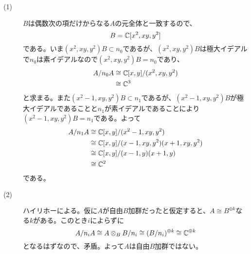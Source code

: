 \subsubsection{}%
\begin{sol} ${}$
\begin{description}
  \item[(1)] $B$は偶数次の項だけからなる$A$の元全体と一致するので、
  \[
B = {\mathbb C}[x^2, xy, y^2]
  \]
  である。いま$(x^2,xy,y^2)B \subset n_0$であるが、$(x^2,xy,y^2)B$は極大イデアルで$n_0$は素イデアルなので$(x^2,xy,y^2)B = n_0$であり、
\begin{align*}
  A/ n_0 A &\cong {\mathbb C}[x,y]/(x^2,xy,y^2) \\
  &\cong {\mathbb C}^{3}
\end{align*}
と求まる。また$(x^2-1,xy,y^2)B \subset n_1$であるが、$(x^2 - 1,xy,y^2)B$が極大イデアルであることと$n_1$が素イデアルであることにより$(x^2 - 1,xy, y^2)B = n_1$である。よって
\begin{align*}
  A/ n_1 A &\cong {\mathbb C}[x,y]/(x^2 - 1,xy, y^2) \\
  &\cong {\mathbb C}[x,y]/(x - 1,xy, y^2)(x + 1,xy, y^2) \\
  &\cong {\mathbb C}[x,y]/(x - 1,y)(x + 1,y) \\
  &\cong {\mathbb C}^2
\end{align*}
である。
\item[(2)] ハイリホーによる。仮に$A$が自由$B$加群だったと仮定すると、$A \cong B^{\oplus k}$なる$k$がある。このとき$i$によらずに
\[
A/ n_i A \cong A \otimes_B B / n_i \cong (B/ n_i)^{\oplus k} \cong {\mathbb C}^{\oplus k}
\]
となるはずなので、矛盾。よって$A$は自由$B$加群ではない。
\end{description}
\end{sol}

